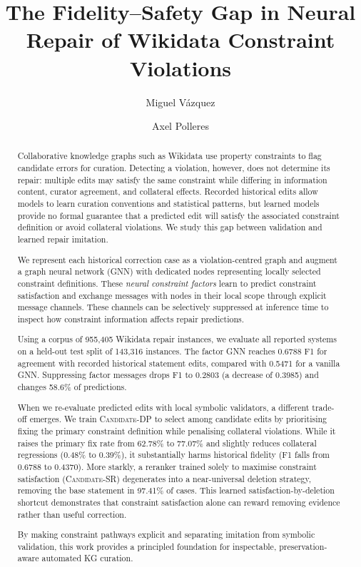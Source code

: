 \documentclass[a4paper,UKenglish,cleveref,autoref,thm-restate]{tgdk-v2021}
\title{The Fidelity--Safety Gap in Neural Repair of Wikidata Constraint Violations}
\author{Miguel V\'azquez}{Vienna University of Economics and Business (WU Wien), Vienna, Austria}{miguel.vazquez@wu.ac.at}{https://orcid.org/0009-0002-9067-959X}{}
\author{Axel Polleres}{Vienna University of Economics and Business (WU Wien), Vienna, Austria}{axel.polleres@wu.ac.at}{https://orcid.org/0000-0001-5670-1146}{}
\begin{document}
\maketitle

\begin{abstract}
Collaborative knowledge graphs such as Wikidata use property constraints to flag candidate errors for curation. Detecting a violation, however, does not determine its repair: multiple edits may satisfy the same constraint while differing in information content, curator agreement, and collateral effects. Recorded historical edits allow models to learn curation conventions and statistical patterns, but learned models provide no formal guarantee that a predicted edit will satisfy the associated constraint definition or avoid collateral violations. We study this gap between validation and learned repair imitation.

We represent each historical correction case as a violation-centred graph and augment a graph neural network (GNN) with dedicated nodes representing locally selected constraint definitions. These \emph{neural constraint factors} learn to predict constraint satisfaction and exchange messages with nodes in their local scope through explicit message channels. These channels can be selectively suppressed at inference time to inspect how constraint information affects repair predictions.

Using a corpus of 955,405 Wikidata repair instances, we evaluate all reported systems on a held-out test split of 143,316 instances. The factor GNN reaches 0.6788 F1 for agreement with recorded historical statement edits, compared with 0.5471 for a vanilla GNN. Suppressing factor messages drops F1 to 0.2803 (a decrease of 0.3985) and changes 58.6\% of predictions.

When we re-evaluate predicted edits with local symbolic validators, a different trade-off emerges. We train \textsc{Candidate-DP} to select among candidate edits by prioritising fixing the primary constraint definition while penalising collateral violations. While it raises the primary fix rate from 62.78\% to 77.07\% and slightly reduces collateral regressions (0.48\% to 0.39\%), it substantially harms historical fidelity (F1 falls from 0.6788 to 0.4370). More starkly, a reranker trained solely to maximise constraint satisfaction (\textsc{Candidate-SR}) degenerates into a near-universal deletion strategy, removing the base statement in 97.41\% of cases. This learned satisfaction-by-deletion shortcut demonstrates that constraint satisfaction alone can reward removing evidence rather than useful correction.

By making constraint pathways explicit and separating imitation from symbolic validation, this work provides a principled foundation for inspectable, preservation-aware automated KG curation.
\end{abstract}
\end{document}
